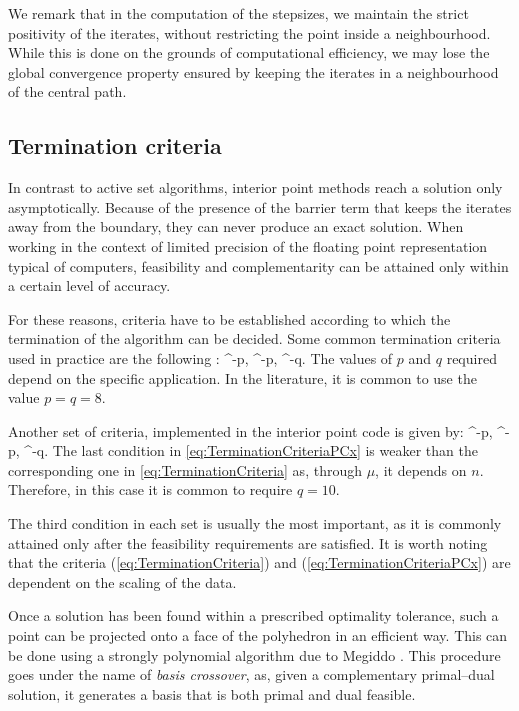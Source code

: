 We remark that in the computation of the stepsizes, we 
maintain the strict positivity of the iterates, without restricting
the point inside a neighbourhood.
While this is done on the grounds of computational efficiency, we may
lose the global convergence property ensured by keeping the
iterates in a neighbourhood of the central path.

%
%
\subsection{Termination criteria}

In contrast to active set algorithms, interior point methods reach a
solution only asymptotically. 
Because of the presence of the barrier term that keeps the iterates
away from the boundary, they can never produce an exact solution.
When working in the context of limited precision of the
floating point representation typical of computers, feasibility and
complementarity can be attained only within a certain level
of accuracy.

For these reasons, criteria have to be established according
to which the termination of the algorithm can be decided.
Some common termination criteria used in practice are the
following \cite{GondzioTerlaky}:
\be  \label{eq:TerminationCriteria}
  ^{-p}, 
\qquad
{}  ^{-p},
\qquad
{}  ^{-q}.
\ee
The values of $p$ and $q$ required depend on the specific application.
In the literature, it is common to use the value $p = q = 8$.

Another set of criteria, implemented in the interior point code
\PCx \cite{PCx} is given by:
\be  \label{eq:TerminationCriteriaPCx}
 ^{-p},
\qquad
{} ^{-p},
\qquad
{} ^{-q}.
\ee
The last condition in \eqref{eq:TerminationCriteriaPCx} is weaker
than the corresponding one in \eqref{eq:TerminationCriteria} as,
through $\mu$, it depends on $n$. Therefore, in this case it is common to 
require $q = 10$.

The third condition in each set is usually the most important, as it is
commonly attained only after the feasibility requirements are satisfied.
It is worth noting that the criteria (\ref{eq:TerminationCriteria})
and (\ref{eq:TerminationCriteriaPCx})
are dependent on the scaling of the data.

Once a solution has been found within a prescribed 
optimality tolerance, such a point can be projected onto a face 
of the polyhedron in an efficient way.
This can be done using a strongly polynomial algorithm due
to Megiddo \cite{Megiddo91}. This procedure goes under the name
of {\em basis crossover}, 
as, given a complementary primal--dual solution, it generates a basis 
that is both primal and dual feasible.

